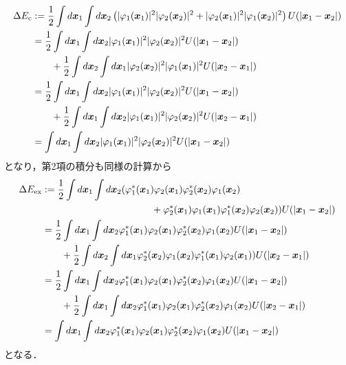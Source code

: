 \documentclass[a4paper,11pt]{jsarticle}
\begin{document}
\begin{align}
  \Delta E_{\mathrm{c}} 
  &:= \frac{1}{2} \int d\bm{x}_1 \int d\bm{x}_2 \left(\lvert \varphi_1(\bm{x}_1) \rvert^2 \lvert \varphi_2(\bm{x}_2) \rvert^2 + \lvert \varphi_2(\bm{x}_1) \rvert^2 \lvert \varphi_1(\bm{x}_2) \rvert^2 \right) U(\lvert\bm{x}_1 - \bm{x}_2\rvert) \notag\\
  &= \frac{1}{2} \int d\bm{x}_1 \int d\bm{x}_2 \lvert \varphi_1(\bm{x}_1) \rvert^2 \lvert \varphi_2(\bm{x}_2) \rvert^2 U(\lvert\bm{x}_1 - \bm{x}_2\rvert) \notag\\
  &\qquad+ \frac{1}{2}\int d\bm{x}_2 \int d\bm{x}_1\lvert \varphi_2(\bm{x}_2) \rvert^2 \lvert \varphi_1(\bm{x}_1) \rvert^2  U(\lvert\bm{x}_2 - \bm{x}_1\rvert) \notag\\
  &= \frac{1}{2} \int d\bm{x}_1 \int d\bm{x}_2 \lvert \varphi_1(\bm{x}_1) \rvert^2 \lvert \varphi_2(\bm{x}_2) \rvert^2 U(\lvert\bm{x}_1 - \bm{x}_2\rvert) \notag\\
  &\qquad+ \frac{1}{2}\int d\bm{x}_1 \int d\bm{x}_2\lvert \varphi_1(\bm{x}_1) \rvert^2\lvert \varphi_2(\bm{x}_2) \rvert^2   U(\lvert\bm{x}_2 - \bm{x}_1\rvert) \notag\\ 
  &= \int d\bm{x}_1 \int d\bm{x}_2 \lvert \varphi_1(\bm{x}_1) \rvert^2 \lvert \varphi_2(\bm{x}_2) \rvert^2 U(\lvert\bm{x}_1 - \bm{x}_2\rvert)
  \label{Ec}
\end{align}
となり，第2項の積分も同様の計算から
\begin{align}
  \Delta E_{\mathrm{ex}} 
  &:= \frac{1}{2} \int d\bm{x}_1 \int d\bm{x}_2 ( \varphi^*_1(\bm{x}_1)\varphi_2(\bm{x}_1)\varphi^*_2(\bm{x}_2)\varphi_1(\bm{x}_2) \notag\\
  &\hspace{4cm} + \varphi^*_2(\bm{x}_1)\varphi_1(\bm{x}_1)\varphi^*_1(\bm{x}_2)\varphi_2(\bm{x}_2)  ) U(\lvert\bm{x}_1 - \bm{x}_2\rvert) \notag\\
  &= \frac{1}{2} \int d\bm{x}_1 \int d\bm{x}_2 \varphi^*_1(\bm{x}_1)\varphi_2(\bm{x}_1)\varphi^*_2(\bm{x}_2)\varphi_1(\bm{x}_2) U(\lvert\bm{x}_1 - \bm{x}_2\rvert) \notag\\
  &\qquad + \frac{1}{2}\int d\bm{x}_2 \int d\bm{x}_1 \varphi^*_2(\bm{x}_2)\varphi_1(\bm{x}_2)\varphi^*_1(\bm{x}_1)\varphi_2(\bm{x}_1) ) U(\lvert\bm{x}_2 - \bm{x}_1\rvert) \notag\\
  &= \frac{1}{2} \int d\bm{x}_1 \int d\bm{x}_2 \varphi^*_1(\bm{x}_1)\varphi_2(\bm{x}_1)\varphi^*_2(\bm{x}_2)\varphi_1(\bm{x}_2) U(\lvert\bm{x}_1 - \bm{x}_2\rvert) \notag\\
  &\qquad +\frac{1}{2} \int d\bm{x}_1 \int d\bm{x}_2 \varphi^*_1(\bm{x}_1)\varphi_2(\bm{x}_1)\varphi^*_2(\bm{x}_2)\varphi_1(\bm{x}_2) U(\lvert\bm{x}_2 - \bm{x}_1\rvert) \notag\\
  &= \int d\bm{x}_1 \int d\bm{x}_2 \varphi^*_1(\bm{x}_1)\varphi_2(\bm{x}_1)\varphi^*_2(\bm{x}_2)\varphi_1(\bm{x}_2) U(\lvert\bm{x}_1 - \bm{x}_2\rvert) 
  \label{Eex}
\end{align}
となる．
\end{document}
